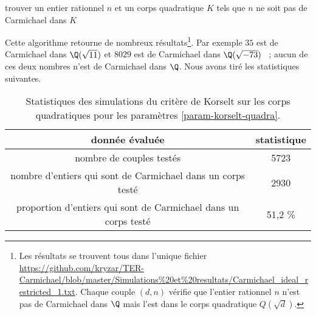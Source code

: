\vspace{1em}
\begin{algorithm}[H]\label{test-Fermat-quadratique}
\caption{trouver un entier rationnel $n$ et un corps quadratique $K$ tels que $n$ ne soit pas de Carmichael dans $K$}
\end{algorithm}
\vspace{1em}

Cette algorithme retourne de nombreux résultats\footnote{Les résultats se trouvent tous dans l'unique fichier \url{https://github.com/kryzar/TER-Carmichael/blob/master/Simulations\%20et\%20resultats/Carmichael\_ideal\_restricted\_1.txt}. Chaque couple $(d, n)$ vérifie que l'entier rationnel $n$ n'est pas de Carmichael dans $\Q$ mais l'est dans le corps quadratique $Q(\sqrt{d})$.}. Par exemple $35$ est de Carmichael dans $\Q(\sqrt{11})$ et $8029$ est de Carmichael dans $\Q(\sqrt{-73})$ ~; aucun de ces deux nombres n'est de Carmichael dans $\Q$. Nous avons tiré les statistiques suivantes.

\begin{table}[H]
	\begin{center}
		\begin{tabular}{|c|c|}
			\hline
			donnée évaluée & statistique \\
			\hline
			\hline
			nombre de couples testés & 5723 \\\hline
			nombre d'entiers qui sont de Carmichael dans un corps testé & 2930 \\\hline
			proportion d'entiers qui sont de Carmichael dans un corps testé & 51,2 \% \\\hline
		\end{tabular}
		\caption{Statistiques des simulations du critère de Korselt sur les corps quadratiques pour les paramètres \ref{param-korselt-quadra}.}
	\end{center}
\end{table}

